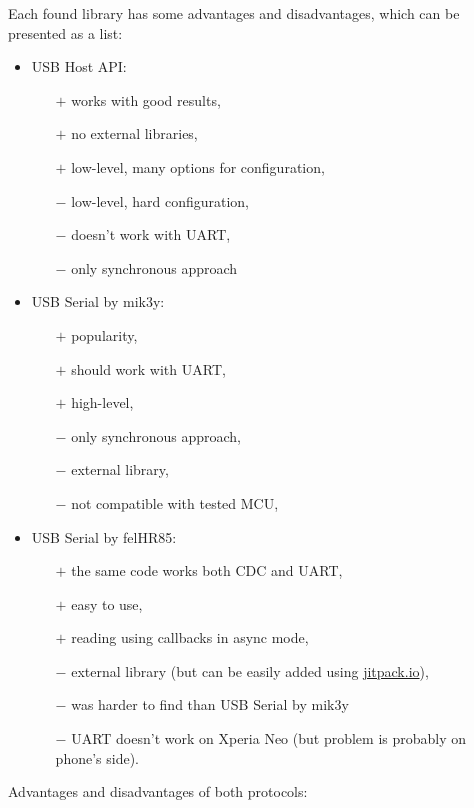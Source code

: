 Each found library has some advantages and disadvantages, which can be presented
as a list:
\begin{itemize}
  \item USB Host API:
  	\begin{itemize}
  	  \item[$+$] works with good results,
  	  \item[$+$] no external libraries,
  	  \item[$+$] low-level, many options for configuration,
  	  \item[$-$] low-level, hard configuration,
  	  \item[$-$] doesn't work with UART,
  	  \item[$-$] only synchronous approach
  	\end{itemize}
  \item USB Serial by mik3y:
	\begin{itemize}
  	  \item[$+$] popularity,
  	  \item[$+$] should work with UART,
  	  \item[$+$] high-level,
  	  \item[$-$] only synchronous approach,
  	  \item[$-$] external library,
  	  \item[$-$] not compatible with tested MCU,
  	\end{itemize}
  \item USB Serial by felHR85:
	\begin{itemize}
	  \item[$+$] the same code works both CDC and UART,
	  \item[$+$] easy to use,
	  \item[$+$] reading using callbacks in async mode,
  	  \item[$-$] external library (but can be easily added using
  	  	\url{jitpack.io}),
  	  \item[$-$] was harder to find than USB Serial by mik3y
  	  \item[$-$] UART doesn't work on Xperia Neo (but problem is probably on
  	  	phone's side).
  	\end{itemize}
\end{itemize}
Advantages and disadvantages of both protocols:
